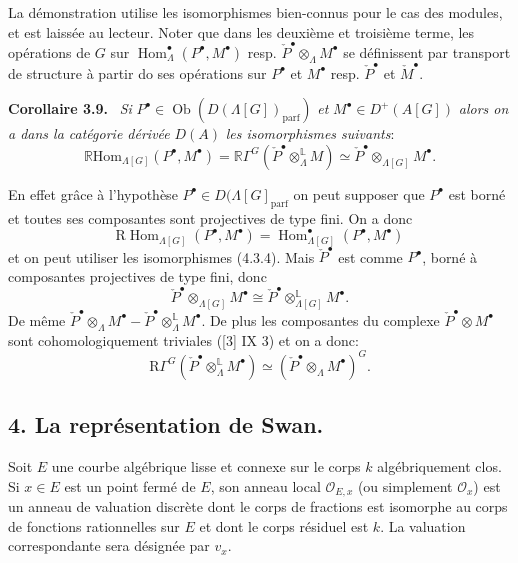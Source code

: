 \documentclass[11pt]{article}
\newenvironment{statement}[1]{\par\medskip\noindent\textbf{#1.}\ }{\par\medskip}
\DeclareMathOperator{\Hom}{Hom}
\newcommand{\R}{\mathbb{R}}\newcommand{\RHomCore}{\mathbb{R}\mathrm{Hom}}
\providecommand{\RHom}{\RHomCore}
\providecommand{\parf}{\mathrm{parf}}
\providecommand{\RHom}{\RHomCore}
\providecommand{\Hom}{\operatorname{Hom}}
\providecommand{\RHom}{\R\mathcal{H}om}
\providecommand{\R}{\mathrm R}
\providecommand{\parf}{\mathrm{parf}}
\providecommand{\RHom}{\RHomCore}
\providecommand{\Hom}{\operatorname{Hom}}
\begin{document}
La démonstration utilise les isomorphismes bien-connus pour le cas des modules, et est laissée au lecteur. Noter que dans les deuxième et troisième terme, les opérations de $G$ sur $\Hom_\Lambda^\bullet(P^\bullet,M^\bullet)$ resp. $\check P^\bullet\otimes_\Lambda M^\bullet$ se définissent par transport de structure à partir do ses opérations sur $P^\bullet$ et $M^\bullet$ resp. $\check P^\bullet$ et $\check M^\bullet$.

\begin{statement}{Corollaire 3.9}
\emph{Si} $P^\bullet\in \operatorname{Ob}(D(\Lambda[G])_{\parf})$ \emph{et} $M^\bullet\in D^+(A[G])$ \emph{alors on a dans la catégorie dérivée} $D(A)$ \emph{les isomorphismes suivants}:
\[
\RHom_{\Lambda[G]}(P^\bullet,M^\bullet)
=\R\Gamma^G(\check P^\bullet\otimes_\Lambda^{\mathbb{L}}M)
\simeq \check P^\bullet\otimes_{\Lambda[G]}M^\bullet.
\tag{3.9.1}
\]
\end{statement}

En effet grâce à l'hypothèse $P^\bullet\in D(\Lambda[G]_{\parf}$ on peut supposer que $P^\bullet$ est borné et toutes ses composantes sont projectives de type 
fini. On a donc
\[
\mathrm{R}\Hom_{\Lambda[G]}(P^\bullet,M^\bullet)=\Hom_{\Lambda[G]}^\bullet(P^\bullet,M^\bullet)
\]
et on
peut utiliser les isomorphismes (4.3.4). Mais $\check P^\bullet$ est comme $P^\bullet$, borné à composantes projectives de type fini, donc
\[
\check P^\bullet\otimes_{\Lambda[G]}M^\bullet\cong \check P^\bullet\otimes_{\Lambda[G]}^{\mathbb{L}}M^\bullet.
\]
De même $\check P^\bullet\otimes_\Lambda M^\bullet-\check P^\bullet\otimes_\Lambda^{\mathbb{L}}M^\bullet$. De plus les composantes du complexe $\check P^\bullet\otimes M^\bullet$ sont cohomologiquement triviales ([3] IX 3) et on a donc:
\[
\mathrm{R}\Gamma^G(\check P^\bullet\otimes_\Lambda^{\mathbb{L}}M^\bullet)\simeq (\check P^\bullet\otimes_\Lambda M^\bullet)^G.
\]

\subsection*{4. La représentation de Swan.}

Soit $E$ une courbe algébrique lisse et connexe sur le corps $k$ algébriquement clos. Si $x\in E$ est un point fermé de $E$, son anneau local $\mathcal O_{E,x}$ (ou simplement $\mathcal O_x$) est un anneau de valuation discrète dont le corps de fractions est isomorphe au corps de fonctions rationnelles sur $E$ et dont le corps résiduel est $k$. La valuation correspondante sera désignée par $v_x$.
\end{document}

